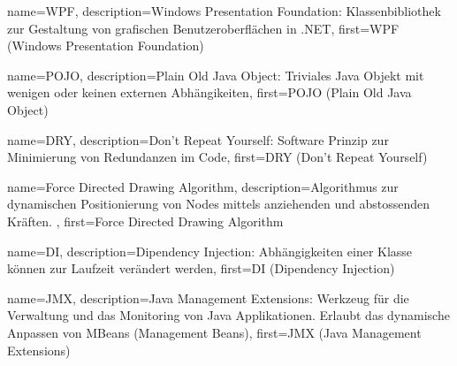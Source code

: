 {
	name={WPF},
	description={Windows Presentation Foundation: Klassenbibliothek zur Gestaltung von grafischen Benutzeroberflächen in .NET},
	first={WPF (Windows Presentation Foundation)}
}

{
	name={POJO},
	description={Plain Old Java Object: Triviales Java Objekt mit wenigen oder keinen externen Abhängikeiten},
	first={POJO (Plain Old Java Object)}
}

{
	name={DRY},
	description={Don't Repeat Yourself: Software Prinzip zur Minimierung von Redundanzen im Code},
	first={DRY (Don't Repeat Yourself)}
}

{
	name={Force Directed Drawing Algorithm},
	description={Algorithmus zur dynamischen Positionierung von Nodes mittels anziehenden und abstossenden Kräften. },
	first={Force Directed Drawing Algorithm}
}

{
	name={DI},
	description={Dipendency Injection: Abhängigkeiten einer Klasse können zur Laufzeit verändert werden},
	first={DI (Dipendency Injection)}
}

{
	name={JMX},
	description={Java Management Extensions: Werkzeug für die Verwaltung und das Monitoring von Java Applikationen. Erlaubt das dynamische Anpassen von MBeans (Management Beans)},
	first={JMX (Java Management Extensions)}
}




